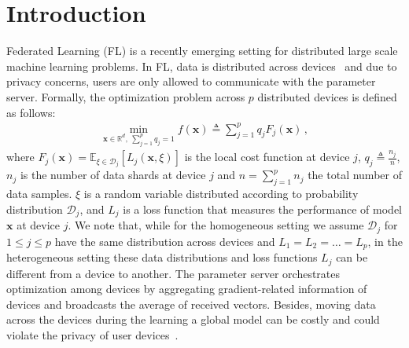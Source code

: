\documentclass[twoside]{article}
\begin{document}
\vspace{-0.2in}
\section{Introduction}
\vspace{-0.05in}
Federated Learning (FL) is a recently emerging setting for distributed large scale machine learning problems.
In FL, data is distributed across devices~\cite{mcmahan2016communication,konevcny2016federated} and due to privacy concerns, users are only allowed to communicate with the parameter server.
Formally, the optimization problem across $p$ distributed devices is defined as follows:
\begin{align}\label{eq:main}
   \min_{\boldsymbol{x}\in \mathbb{R}^{d},\: \sum_{j=1}^pq_j=1} f(\boldsymbol{x})\triangleq \sum_{j=1}^{p}q_jF_j(\boldsymbol{x}) \, , 
\end{align}
where $F_j(\boldsymbol{x})=\mathbb{E}_{\xi\in\mathcal{D}_j}\left[L_j\left(\boldsymbol{x},\xi\right)\right]$ is the local cost function at device $j$, $q_j\triangleq\frac{n_j}{n}$, $n_j$ is the number of data shards at device $j$ and $n=\sum_{j=1}^pn_j$ the total number of data samples.
$\xi$ is a random variable distributed according to probability distribution $\mathcal{D}_j$, and $L_j$ is a loss function that measures the performance of model $\boldsymbol{x}$ at device $j$. 
We note that, while for the homogeneous setting we assume $\mathcal{D}_j$ for $1\leq j\leq p$ have the same distribution across devices and $L_1=L_2=\ldots=L_p$, in the heterogeneous setting these data distributions and loss functions $L_j$ can be different from a device to another. 
The parameter server orchestrates optimization among devices by aggregating gradient-related information of devices and broadcasts the average of received vectors. 
Besides, moving data across the devices during the learning a global model can be costly and could violate the privacy of user devices~\cite{carlini2019secret,mcmahan2017learning}. 
\end{document}
